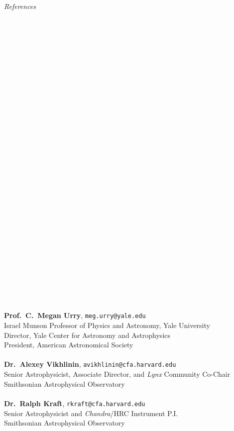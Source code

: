\documentclass[11pt]{article}
\begin{document}
\vspace{4mm}



\hspace{2.5mm} \parbox{1.5in}{\textit{References \\\\\\\\\\\\\\\\\\\\\\\\\\\\\\\\\\\\\\\\\\\\\\\\\\\\\\\\\\\\\\}} \parbox{5.15in}{
\textbf{Prof.~C.~Megan Urry}, \texttt{meg.urry@yale.edu}\\
Israel Munson Professor of Physics and Astronomy, Yale University\\
Director, Yale Center for Astronomy and Astrophysics\\
President, American Astronomical Society\\ \\
\textbf{Dr.~Alexey Vikhlinin}, \texttt{avikhlinin@cfa.harvard.edu}\\
Senior Astrophysicist, Associate Director, and \textit{Lynx} Community Co-Chair\\
Smithsonian Astrophysical Observatory\\ \\
\textbf{Dr.~Ralph Kraft}, \texttt{rkraft@cfa.harvard.edu}\\
Senior Astrophysicist and \textit{Chandra}/HRC Instrument P.I.\\
Smithsonian Astrophysical Observatory\\ \\
}
\end{document}
